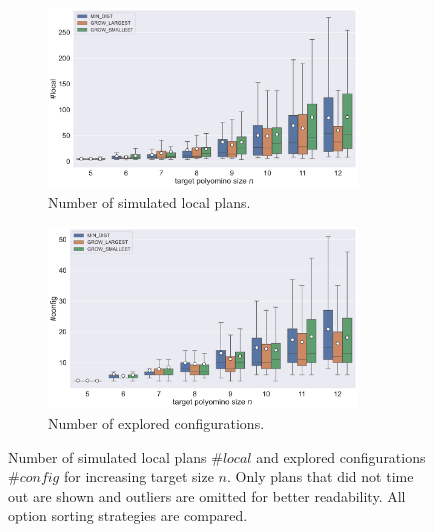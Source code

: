 \begin{figure}
	\centering
	\begin{subfigure}[b]{\textwidth}
		\centering
		\includegraphics[width=0.9\textwidth]{figures/plots/AFN_nlocal.pdf}
		\caption{Number of simulated local plans.}
		\label{fig:AFN_nlocal}
	\end{subfigure}
	
	\begin{subfigure}[b]{\textwidth}
		\centering
		\includegraphics[width=0.9\textwidth]{figures/plots/AFN_nconfig.pdf}
		\caption{Number of explored configurations.}
		\label{fig:AFN_nconfig}
	\end{subfigure}
	\caption[Number of simulated local plans and explored configurations for increasing target size]{Number of simulated local plans $\#\textit{local}$ and explored configurations $\#\textit{config}$ for increasing target size $n$. Only plans that did not time out are shown and outliers are omitted for better readability. All option sorting strategies are compared.}
	\label{fig:AFN_planstats}
\end{figure}


